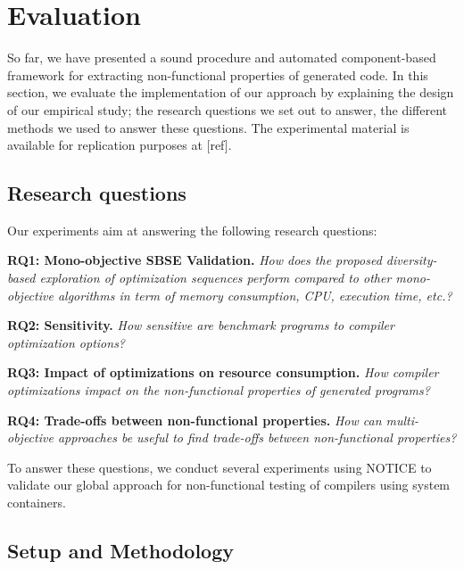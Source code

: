 \section{Evaluation}
So far, we have presented a sound procedure and automated component-based framework for extracting non-functional properties of generated code. In this section, we evaluate the implementation of our approach by explaining the design of our empirical study; the research questions we set out to answer, the different methods we used to answer these questions. The experimental material is
available for replication purposes at [ref].

\subsection{Research questions}
Our experiments aim at answering the following research questions:

\textbf{RQ1: Mono-objective SBSE Validation.} 
\textit{How does the proposed diversity-based exploration of optimization sequences perform compared to other mono-objective algorithms in term of memory consumption, CPU, execution time, etc.?} 
 

\textbf{RQ2: Sensitivity.} 
\textit{How sensitive are benchmark programs to compiler optimization options?}



\textbf{RQ3: Impact of optimizations on resource consumption.} 
\textit{How compiler optimizations impact on the non-functional properties of generated programs?}


\textbf{RQ4: Trade-offs between non-functional properties.} 
\textit{How can multi-objective approaches be useful to find trade-offs between non-functional properties?}

To answer these questions, we conduct several experiments using NOTICE to validate our global approach for non-functional testing of compilers using system containers.
 

\subsection{Setup and Methodology}
